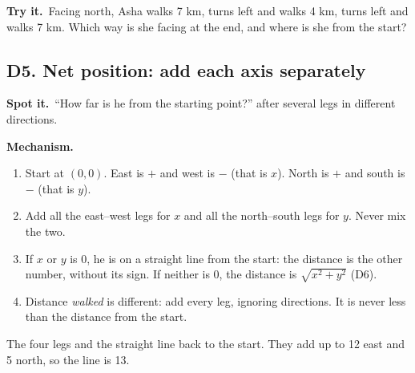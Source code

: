 \documentclass[11pt,a4paper]{article}
\let\oldsubsection\subsection
\renewcommand{\subsection}{\needspace{9\baselineskip}\oldsubsection}
\newcommand{\spot}{\textbf{\color{ember}Spot it.}\ }
\newcommand{\mech}{\textbf{\color{ember}Mechanism.}\ }
\newcommand{\tryit}[1]{\textbf{\color{ember}Try it.}\ #1}
\begin{document}
\tryit Facing north, Asha walks 7 km, turns left and walks 4 km, turns left and walks 7 km. Which way is she facing at the end, and where is she from the start?

\subsection{D5. Net position: add each axis separately}
\spot ``How far is he from the starting point?'' after several legs in different directions.

\mech
\begin{enumerate}
\item Start at $(0,0)$. East is $+$ and west is $-$ (that is $x$). North is $+$ and south is $-$ (that is $y$).
\item Add all the east--west legs for $x$ and all the north--south legs for $y$. Never mix the two.
\item If $x$ or $y$ is 0, he is on a straight line from the start: the distance is the other number, without its sign. If neither is 0, the distance is $\sqrt{x^2+y^2}$ (D6).
\item Distance \emph{walked} is different: add every leg, ignoring directions. It is never less than the distance from the start.
\end{enumerate}

\begin{center}
\par\nopagebreak\smallskip
{\small The four legs and the straight line back to the start. They add up to 12 east and 5 north, so the line is 13.}
\end{center}
\end{document}
